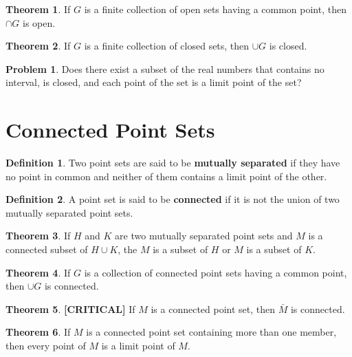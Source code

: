 \documentclass{article}
\theoremstyle{definition}
\newtheorem{definition}{Definition}
\newtheorem{theorem}{Theorem}
\theoremstyle{definition}
\newtheorem{problem}{Problem}
\theoremstyle{plain}
\begin{document}
\begin{theorem}
  If $G$ is a finite collection of open sets having a common point, then $\cap
  G$ is open.
\end{theorem}

\begin{theorem}
  If $G$ is a finite collection of closed sets, then $\cup G$ is closed.
\end{theorem}

\begin{problem}
  Does there exist a subset of the real numbers that contains no interval, is
  closed, and each point of the set is a limit point of the set?
\end{problem}

\section*{Connected Point Sets}

\begin{definition}
  Two point sets are said to be \textbf{mutually separated} if they have no
  point in common and neither of them contains a limit point of the other.
\end{definition}

\begin{definition}
  A point set is said to be \textbf{connected} if it is not the union of two
  mutually separated point sets.
\end{definition}

\begin{theorem}
  If $H$ and $K$ are two mutually separated point sets and $M$ is a connected
  subset of $H \cup K$, the $M$ is a subset of $H$ or $M$ is a subset of $K$.
\end{theorem}

\begin{theorem}
  If $G$ is a collection of connected point sets having a common point, then
  $\cup G$ is connected.
\end{theorem}

\begin{theorem}
  \textbf{[CRITICAL]} If $M$ is a connected point set, then $\bar{M}$ is
  connected.
\end{theorem}

\begin{theorem}
  If $M$ is a connected point set containing more than one member, then every
  point of $M$ is a limit point of $M$.
\end{theorem}
\end{document}
